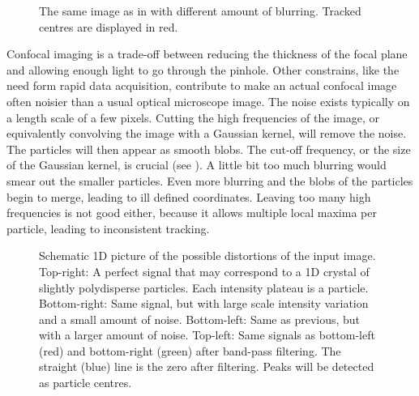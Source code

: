 \begin{figure}
	\centering
	\quad
	\caption{The same image as in  with different amount of blurring. Tracked centres are displayed in red.}
	\label{fig:bad_blur}
\end{figure}

Confocal imaging is a trade-off between reducing the thickness of the focal plane and allowing enough light to go through the pinhole. Other constrains, like the need form rapid data acquisition, contribute to make an actual confocal image often noisier than a usual optical microscope image. The noise exists typically on a length scale of a few pixels. Cutting the high frequencies of the image, or equivalently convolving the image with a Gaussian kernel, will remove the noise. The particles will then appear as smooth blobs. The cut-off frequency, or the size of the Gaussian kernel, is crucial (see ). A little bit too much blurring would smear out the smaller particles. Even more blurring and the blobs of the particles begin to merge, leading to ill defined coordinates. Leaving too many high frequencies is not good either, because it allows multiple local maxima per particle, leading to inconsistent tracking.

\begin{figure}
	\centering
	\def\svgwidth{\textwidth}
	
	\caption{Schematic 1D picture of the possible distortions of the input image. Top-right: A perfect signal that may correspond to a 1D crystal of slightly polydisperse particles. Each intensity plateau is a particle. Bottom-right: Same signal, but with large scale intensity variation and a small amount of noise. Bottom-left: Same as previous, but with a larger amount of noise. Top-left: Same signals as bottom-left (red) and bottom-right (green) after band-pass filtering. The straight (blue) line is the zero after filtering. Peaks will be detected as particle centres.}
	\label{fig:track1D}
\end{figure}

